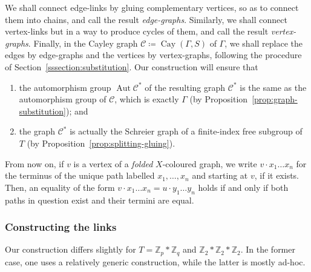 \documentclass[10pt,a4paper]{amsart}
\theoremstyle{definition}
\newcommand{\ZZ}{\mathbb{Z}}
\newcommand{\cC}{\mathcal{C}}
\DeclareMathOperator{\Cay}{Cay}
\DeclareMathOperator{\aut}{Aut}
\begin{document}
We shall connect edge-links by gluing complementary vertices, so as to connect them into chains, and call the result \emph{edge-graphs}. Similarly, we shall connect vertex-links but in a way to produce cycles of them, and call the result \emph{vertex-graphs}. Finally, in the Cayley graph $\cC\coloneqq \Cay({\Gamma},S)$ of ${\Gamma}$, we shall replace the edges by edge-graphs and the vertices by vertex-graphs, following the procedure of Section~\ref{sssection:substitution}. Our construction will ensure that
\begin{enumerate}
\item %
the automorphism group $\aut \cC^*$ of the resulting graph $\cC^*$ is the same as the automorphism group of $\cC$, which is exactly ${\Gamma}$ (by Proposition~\ref{prop:graph-substitution}); and 
\item %
the graph $\cC^*$ is actually the Schreier graph of a finite-index free subgroup of $T$ (by Proposition~\ref{prop:splitting-gluing}).
\end{enumerate}
 
From now on, if $v$ is a vertex of a \emph{folded} $X$-coloured graph, we write $v\cdot x_{1} \dots x_n$ for the terminus of the unique path labelled $x_{1}, \dots ,x_n$ and starting at $v$, if it exists. Then, an equality of the form $v\cdot x_{1} \dots x_n = u\cdot y_{1} \dots y_n$ holds if and only if both paths in question exist and their termini are equal. 

\subsubsection{Constructing the links}\label{section:constructionofthelinks}
 
Our construction differs slightly for $T = \ZZ_p*\ZZ_q$ and $\ZZ_2*\ZZ_2*\ZZ_2$. In the former case, one uses a relatively generic construction, while the latter is mostly ad-hoc.

\end{document}
